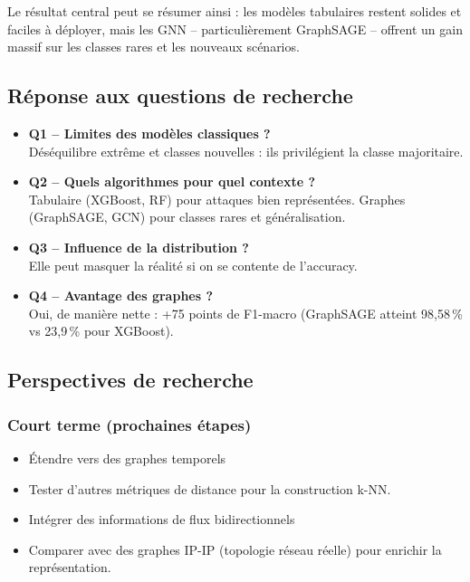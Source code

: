 ﻿\documentclass[11pt,a4paper]{article}
\begin{document}
Le résultat central peut se résumer ainsi : les modèles tabulaires restent solides et faciles à déployer, mais les GNN -- particulièrement GraphSAGE -- offrent un gain massif sur les classes rares et les nouveaux scénarios.

\subsection{Réponse aux questions de recherche}

\begin{itemize}
    \item \textbf{Q1 -- Limites des modèles classiques ?}\\
    Déséquilibre extrême et classes nouvelles : ils privilégient la classe majoritaire.
    \item \textbf{Q2 -- Quels algorithmes pour quel contexte ?}\\
    Tabulaire (XGBoost, RF) pour attaques bien représentées. Graphes (GraphSAGE, GCN) pour classes rares et généralisation.
    \item \textbf{Q3 -- Influence de la distribution ?}\\
    Elle peut masquer la réalité si on se contente de l'accuracy.
    \item \textbf{Q4 -- Avantage des graphes ?}\\
    Oui, de manière nette : +75 points de F1-macro (GraphSAGE atteint 98,58\,\% vs 23,9\,\% pour XGBoost).
\end{itemize}

\subsection{Perspectives de recherche}

\subsubsection{Court terme (prochaines étapes)}

\begin{itemize}
    \item Étendre vers des graphes temporels
    \item Tester d'autres métriques de distance pour la construction k-NN.
    \item Intégrer des informations de flux bidirectionnels 
    \item Comparer avec des graphes IP-IP (topologie réseau réelle) pour enrichir la représentation.
\end{itemize}
\end{document}

